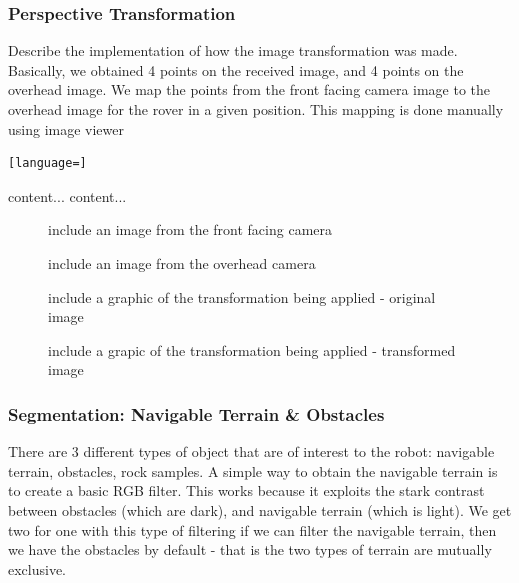 \documentclass[a4paper]{article}
\begin{document}
\subsubsection{Perspective Transformation}
Describe the implementation of how the image transformation was made. Basically, we obtained 4 points on the received image, and 4 points on the overhead image. We map the points from the front facing camera image to the overhead image for the rover in a given position. This mapping is done manually using image viewer

\begin{lstlisting}[language=]

\end{lstlisting}

\begin{table}
\caption{include a table which has the points that we need to map to the other points}
\begin{tabular}{content...}
content...
\end{tabular}
\end{table}

\begin{figure}
\begin{minipage}{0.45\linewidth}
\centering
\caption{include an image from the front facing camera}
\end{minipage}
\begin{minipage}{0.45\linewidth}
\centering
\caption{include an image from the overhead camera}
\end{minipage}
\end{figure}

\begin{figure}
\begin{minipage}{0.45\linewidth}
\centering
\caption{include a graphic of the transformation being applied - original image}
\end{minipage}
\begin{minipage}{0.45\linewidth}
\centering
\caption{include a grapic of the transformation being applied - transformed image}
\end{minipage}
\end{figure}

\subsubsection{Segmentation: Navigable Terrain \& Obstacles}
There are 3 different types of object that are of interest to the robot: navigable terrain, obstacles, rock samples. A simple way to obtain the navigable terrain is to create a basic RGB filter. This works because it exploits the stark contrast between obstacles (which are dark), and navigable terrain (which is light). We get two for one with this type of filtering if we can filter the navigable terrain, then we have the obstacles by default - that is the two types of terrain are mutually exclusive.
\end{document}
